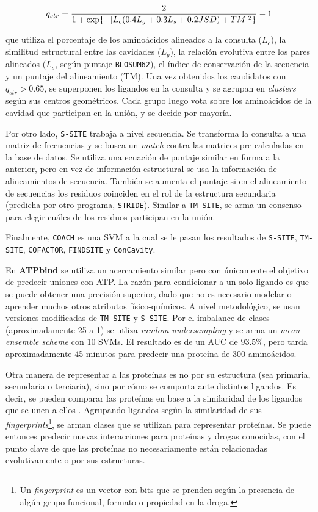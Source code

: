 \documentclass[
    left=2.0cm,         %
    right=2.0cm,        %
    top=2.0cm,          %
    bottom=2.5cm,         %
    bindingoffset=6mm,  %
    nohyphenation=false %
]{eiti/eiti-thesis}
\begin{document}
\begin{equation*}
    \LARGE 
    q_{str} = \frac{2}{1+\exp\{-[L_c(0.4L_g+0.3L_s+0.2JSD)+TM]^2\}} - 1
\end{equation*}

que utiliza el porcentaje de los aminoácidos alineados a la consulta ($L_c$),
la similitud estructural entre las cavidades ($L_g$), la relación evolutiva entre
los pares alineados ($L_s$, según puntaje \texttt{BLOSUM62}), el índice de conservación
de la secuencia y un puntaje del alineamiento (TM). Una vez obtenidos los candidatos
con $q_{str} > 0.65$, se superponen los ligandos en la consulta y se agrupan en
\textit{clusters} según sus centros geométricos. Cada grupo luego vota sobre los
aminoácidos de la cavidad que participan en la unión, y se decide por mayoría.

Por otro lado, \texttt{S-SITE} trabaja a nivel secuencia. Se transforma la consulta
a una matriz de frecuencias y se busca un \textit{match} contra las matrices pre-calculadas
en la base de datos. Se utiliza una ecuación de puntaje similar en forma a la anterior,
pero en vez de información estructural se usa la información de alineamientos de secuencia.
También se aumenta el puntaje si en el alineamiento de secuencias los residuos coinciden
en el rol de la estructura secundaria (predicha por otro programa, \texttt{STRIDE}). Similar
a \texttt{TM-SITE}, se arma un consenso para elegir cuáles de los residuos participan
en la unión.

Finalmente, \texttt{COACH} es una SVM a la cual se le pasan los resultados de \texttt{S-SITE},
\texttt{TM-SITE}, \texttt{COFACTOR}, \texttt{FINDSITE} y \texttt{ConCavity}.

En \textbf{ATPbind}\cite{atpbind} se utiliza un acercamiento similar pero con únicamente el objetivo de
predecir uniones con ATP. La razón para condicionar a un solo ligando es que se puede
obtener una precisión superior, dado que no es necesario modelar o aprender muchos
otros atributos físico-químicos. A nivel metodológico, se usan versiones modificadas de
\texttt{TM-SITE} y \texttt{S-SITE}. Por el imbalance de clases (aproximadamente 25 a 1)
se utliza \textit{random undersampling} y se arma un \textit{mean ensemble scheme} con
10 SVMs. El resultado es de un AUC de $93.5\%$, pero tarda aproximadamente 45 minutos
para predecir una proteína de 300 aminoácidos.

Otra manera de representar a las proteínas es no por su estructura (sea primaria,
secundaria o terciaria), sino por cómo se comporta ante distintos ligandos. Es decir,
se pueden comparar las proteínas en base a la similaridad de los ligandos que se
unen a ellos \cite{keiser2009newtargetsknowndrugs} \cite{keiserhert2008relatingdrugclasses}.
Agrupando ligandos según la similaridad de sus \textit{fingerprints}\footnote{Un \textit{fingerprint}
es un vector con bits que se prenden según la presencia de algún grupo funcional, formato o
propiedad en la droga.}, se arman 
clases que se utilizan para representar proteínas. Se puede entonces predecir
nuevas interacciones para proteínas y drogas conocidas, con el punto clave de que
las proteínas no necesariamente están relacionadas evolutivamente o por sus
estructuras.
\end{document}
